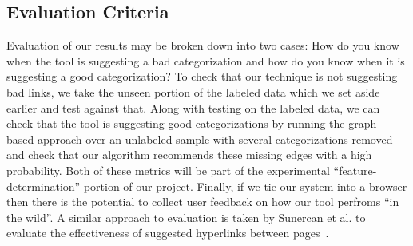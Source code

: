 \documentclass{sig-alternate}
\begin{document}
\subsection{Evaluation Criteria}
\label{subsec:eval_criteria}
Evaluation of our results may be broken down into two cases: How do you know when the tool is suggesting a bad categorization and how do you know when it is suggesting a good categorization? To check that our technique is not suggesting bad links, we take the unseen portion of the labeled data which we set aside earlier and test against that. Along with testing on the labeled data, we can check that the tool is suggesting good categorizations by running the graph based-approach over an unlabeled sample with several categorizations removed and check that our algorithm recommends these missing edges with a high probability. Both of these metrics will be part of the experimental ``feature-determination'' portion of our project. Finally, if we tie our system into a browser then there is the potential to collect user feedback on how our tool perfroms ``in the wild''. A similar approach to evaluation is taken by Sunercan et al.  to evaluate the effectiveness of suggested hyperlinks between pages~\cite{Sunercan}.
\end{document}
